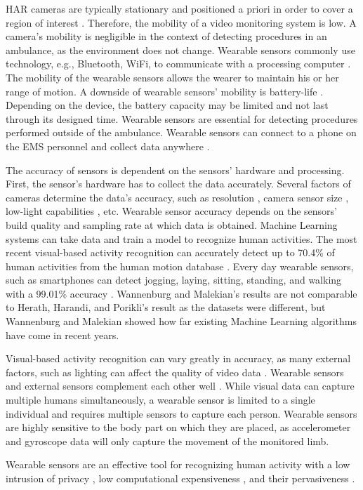 \par HAR cameras are typically stationary and positioned a priori in order to cover a region of interest \cite{Poppe2010}. Therefore, the mobility of a video monitoring system is low. A camera's mobility is negligible in the context of detecting procedures in an ambulance, as the environment does not change. Wearable sensors commonly use technology, e.g., Bluetooth, WiFi, to communicate with a processing computer \cite{Lara2013}. The mobility of the wearable sensors allows the wearer to maintain his or her range of motion. A downside of wearable sensors' mobility is battery-life \cite{Lara2013}. Depending on the device, the battery capacity may be limited and not last through its designed time. Wearable sensors are essential for detecting procedures performed outside of the ambulance. Wearable sensors can connect to a phone on the EMS personnel and collect data anywhere \cite{Lara2013}.
\par The accuracy of sensors is dependent on the sensors' hardware and processing. First, the sensor's hardware has to collect the data accurately. Several factors of cameras determine the data's accuracy, such as resolution \cite{doermann2003progress}, camera sensor size \cite{6712704}, low-light capabilities \cite{1315150}, etc. Wearable sensor accuracy depends on the sensors' build quality and sampling rate at which data is obtained. Machine Learning systems can take data and train a model to recognize human activities. The most recent visual-based activity recognition can accurately detect up to 70.4\% \cite{Herath2017} of human activities from the human motion database \cite{Kuehne11}. Every day wearable sensors, such as smartphones can detect jogging, laying, sitting, standing, and walking with a 99.01\% accuracy \cite{Wannenburg2016}. Wannenburg and Malekian's \cite{Wannenburg2016} results are not comparable to Herath, Harandi, and Porikli's \cite{Herath2017} result as the datasets were different, but Wannenburg and Malekian showed how far existing Machine Learning algorithms have come in recent years.
\par Visual-based activity recognition can vary greatly in accuracy, as many external factors, such as lighting can affect the quality of video data \cite{1315150}. Wearable sensors and external sensors complement each other well \cite{5482111}. While visual data can capture multiple humans simultaneously, a wearable sensor is limited to a single individual and requires multiple sensors to capture each person. Wearable sensors are highly sensitive to the body part on which they are placed, as accelerometer and gyroscope data will only capture the movement of the monitored limb.
\par Wearable sensors are an effective tool for recognizing human activity with a low intrusion of privacy \cite{Lara2013}, low computational expensiveness \cite{Lara2013}, and their pervasiveness \cite{Lara2013}.

